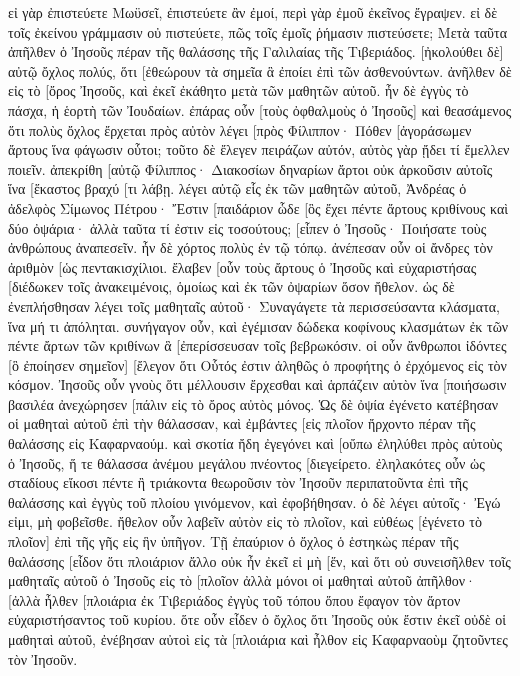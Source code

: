εἰ γὰρ ἐπιστεύετε Μωϋσεῖ, ἐπιστεύετε ἂν ἐμοί, περὶ γὰρ ἐμοῦ ἐκεῖνος ἔγραψεν. 
εἰ δὲ τοῖς ἐκείνου γράμμασιν οὐ πιστεύετε, πῶς τοῖς ἐμοῖς ῥήμασιν πιστεύσετε; 
Μετὰ ταῦτα ἀπῆλθεν ὁ Ἰησοῦς πέραν τῆς θαλάσσης τῆς Γαλιλαίας τῆς Τιβεριάδος. 
[ἠκολούθει δὲ] αὐτῷ ὄχλος πολύς, ὅτι [ἐθεώρουν τὰ σημεῖα ἃ ἐποίει ἐπὶ τῶν ἀσθενούντων. 
ἀνῆλθεν δὲ εἰς τὸ [ὄρος Ἰησοῦς, καὶ ἐκεῖ ἐκάθητο μετὰ τῶν μαθητῶν αὐτοῦ. 
ἦν δὲ ἐγγὺς τὸ πάσχα, ἡ ἑορτὴ τῶν Ἰουδαίων. 
ἐπάρας οὖν [τοὺς ὀφθαλμοὺς ὁ Ἰησοῦς] καὶ θεασάμενος ὅτι πολὺς ὄχλος ἔρχεται πρὸς αὐτὸν λέγει [πρὸς Φίλιππον· Πόθεν [ἀγοράσωμεν ἄρτους ἵνα φάγωσιν οὗτοι; 
τοῦτο δὲ ἔλεγεν πειράζων αὐτόν, αὐτὸς γὰρ ᾔδει τί ἔμελλεν ποιεῖν. 
ἀπεκρίθη [αὐτῷ Φίλιππος· Διακοσίων δηναρίων ἄρτοι οὐκ ἀρκοῦσιν αὐτοῖς ἵνα [ἕκαστος βραχύ [τι λάβῃ. 
λέγει αὐτῷ εἷς ἐκ τῶν μαθητῶν αὐτοῦ, Ἀνδρέας ὁ ἀδελφὸς Σίμωνος Πέτρου· 
Ἔστιν [παιδάριον ὧδε [ὃς ἔχει πέντε ἄρτους κριθίνους καὶ δύο ὀψάρια· ἀλλὰ ταῦτα τί ἐστιν εἰς τοσούτους; 
[εἶπεν ὁ Ἰησοῦς· Ποιήσατε τοὺς ἀνθρώπους ἀναπεσεῖν. ἦν δὲ χόρτος πολὺς ἐν τῷ τόπῳ. ἀνέπεσαν οὖν οἱ ἄνδρες τὸν ἀριθμὸν [ὡς πεντακισχίλιοι. 
ἔλαβεν [οὖν τοὺς ἄρτους ὁ Ἰησοῦς καὶ εὐχαριστήσας [διέδωκεν τοῖς ἀνακειμένοις, ὁμοίως καὶ ἐκ τῶν ὀψαρίων ὅσον ἤθελον. 
ὡς δὲ ἐνεπλήσθησαν λέγει τοῖς μαθηταῖς αὐτοῦ· Συναγάγετε τὰ περισσεύσαντα κλάσματα, ἵνα μή τι ἀπόληται. 
συνήγαγον οὖν, καὶ ἐγέμισαν δώδεκα κοφίνους κλασμάτων ἐκ τῶν πέντε ἄρτων τῶν κριθίνων ἃ [ἐπερίσσευσαν τοῖς βεβρωκόσιν. 
οἱ οὖν ἄνθρωποι ἰδόντες [ὃ ἐποίησεν σημεῖον] [ἔλεγον ὅτι Οὗτός ἐστιν ἀληθῶς ὁ προφήτης ὁ ἐρχόμενος εἰς τὸν κόσμον. 
Ἰησοῦς οὖν γνοὺς ὅτι μέλλουσιν ἔρχεσθαι καὶ ἁρπάζειν αὐτὸν ἵνα [ποιήσωσιν βασιλέα ἀνεχώρησεν [πάλιν εἰς τὸ ὄρος αὐτὸς μόνος. 
Ὡς δὲ ὀψία ἐγένετο κατέβησαν οἱ μαθηταὶ αὐτοῦ ἐπὶ τὴν θάλασσαν, 
καὶ ἐμβάντες [εἰς πλοῖον ἤρχοντο πέραν τῆς θαλάσσης εἰς Καφαρναούμ. καὶ σκοτία ἤδη ἐγεγόνει καὶ [οὔπω ἐληλύθει πρὸς αὐτοὺς ὁ Ἰησοῦς, 
ἥ τε θάλασσα ἀνέμου μεγάλου πνέοντος [διεγείρετο. 
ἐληλακότες οὖν ὡς σταδίους εἴκοσι πέντε ἢ τριάκοντα θεωροῦσιν τὸν Ἰησοῦν περιπατοῦντα ἐπὶ τῆς θαλάσσης καὶ ἐγγὺς τοῦ πλοίου γινόμενον, καὶ ἐφοβήθησαν. 
ὁ δὲ λέγει αὐτοῖς· Ἐγώ εἰμι, μὴ φοβεῖσθε. 
ἤθελον οὖν λαβεῖν αὐτὸν εἰς τὸ πλοῖον, καὶ εὐθέως [ἐγένετο τὸ πλοῖον] ἐπὶ τῆς γῆς εἰς ἣν ὑπῆγον. 
Τῇ ἐπαύριον ὁ ὄχλος ὁ ἑστηκὼς πέραν τῆς θαλάσσης [εἶδον ὅτι πλοιάριον ἄλλο οὐκ ἦν ἐκεῖ εἰ μὴ [ἕν, καὶ ὅτι οὐ συνεισῆλθεν τοῖς μαθηταῖς αὐτοῦ ὁ Ἰησοῦς εἰς τὸ [πλοῖον ἀλλὰ μόνοι οἱ μαθηταὶ αὐτοῦ ἀπῆλθον· 
[ἀλλὰ ἦλθεν [πλοιάρια ἐκ Τιβεριάδος ἐγγὺς τοῦ τόπου ὅπου ἔφαγον τὸν ἄρτον εὐχαριστήσαντος τοῦ κυρίου. 
ὅτε οὖν εἶδεν ὁ ὄχλος ὅτι Ἰησοῦς οὐκ ἔστιν ἐκεῖ οὐδὲ οἱ μαθηταὶ αὐτοῦ, ἐνέβησαν αὐτοὶ εἰς τὰ [πλοιάρια καὶ ἦλθον εἰς Καφαρναοὺμ ζητοῦντες τὸν Ἰησοῦν. 
